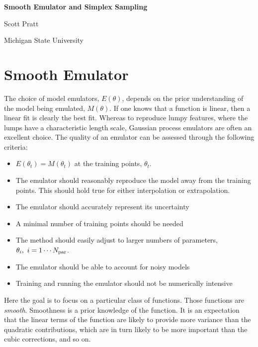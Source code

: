 



\centerline{\bf\Large Smooth Emulator and Simplex Sampling}
\centerline{Scott Pratt}
\centerline{Michigan State University}

\section{Smooth Emulator}

The choice of model emulators, $E(\theta)$, depends on the prior understanding of the model being emulated, $M(\theta)$. If one knows that  a function is linear, then a linear fit is clearly the best fit. Whereas to reproduce lumpy features, where the lumps have a characteristic length scale, Gaussian process emulators are often an excellent choice. The quality of an emulator can be assessed through the following criteria:
\begin{itemize}
  \item $E(\theta_t)=M(\theta_t)$ at the training points, $\theta_t$. 
  \item The emulator should reasonably reproduce the model away from the training points. This should hold true for either interpolation or extrapolation.
  \item The emulator should accurately represent its uncertainty
  \item A minimal number of training points should be needed
  \item The method should easily adjust to larger numbers of parameters, $\theta_i,~i=1\cdots N_{\rm par}$.
  \item The emulator should be able to account for noisy models
  \item Training and running the emulator should not be numerically intensive
\end{itemize}

Here the goal is to focus on a particular class of functions. Those functions are {\it smooth}. Smoothness is a prior knowledge of the function. It is an expectation that the linear terms of the function are likely to provide more variance than the quadratic contributions, which are in turn likely to be more important than the cubic corrections, and so on. 

